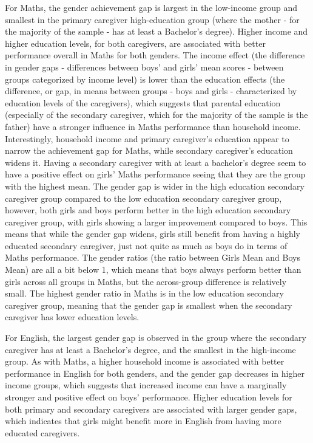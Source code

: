 \documentclass[12pt,a4paper,onecolumn]{article}
\numberwithin{equation}{section}
\begin{document}
For Maths, the gender achievement gap is largest in the low-income group and smallest in the primary caregiver high-education group (where the mother - for the majority of the sample - has at least a Bachelor's degree). Higher income and higher education levels, for both caregivers, are associated with better performance overall in Maths for both genders. The income effect (the difference in gender gaps - differences between boys' and girls' mean scores - between groups categorized by income level) is lower than the education effects (the difference, or gap, in means between groups - boys and girls - characterized by education levels of the caregivers), which suggests that parental education (especially of the secondary caregiver, which for the majority of the sample is the father) have a stronger influence in Maths performance than household income. Interestingly, household income and primary caregiver's education appear to narrow the achievement gap for Maths, while secondary caregiver's education widens it. Having a secondary caregiver with at least a bachelor's degree seem to have a positive effect on girls' Maths performance seeing that they are the group with the highest mean. The gender gap is wider in the high education secondary caregiver group compared to the low education secondary caregiver group, however, both girls and boys perform better in the high education secondary caregiver group, with girls showing a larger improvement compared to boys. This means that while the gender gap widens, girls still benefit from having a highly educated secondary caregiver, just not quite as much as boys do in terms of Maths performance. The gender ratios (the ratio between Girls Mean and Boys Mean) are all a bit below 1, which means that boys always perform better than girls across all groups in Maths, but the across-group difference is relatively small. The highest gender ratio in Maths is in the low education secondary caregiver group, meaning that the gender gap is smallest when the secondary caregiver has lower education levels. 

For English, the largest gender gap is observed in the group where the secondary caregiver has at least a Bachelor's degree, and the smallest in the high-income group. As with Maths, a higher household income is associated with better performance in English for both genders, and the gender gap decreases in higher income groups, which suggests that increased income can have a marginally stronger and positive effect on boys' performance. Higher education levels for both primary and secondary caregivers are associated with larger gender gaps, which indicates that girls might benefit more in English from having more educated caregivers.
\end{document}
